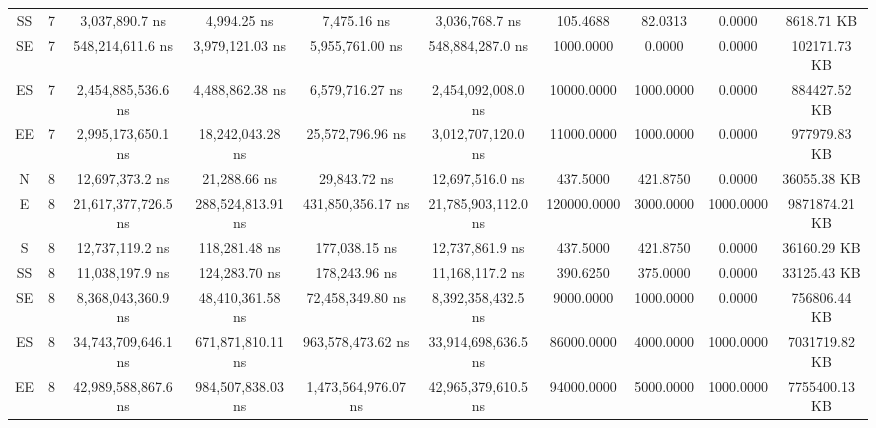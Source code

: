 \begin{sidewaystable}
\begin{tabular}{|c|c|c|c|c|c|c|c|c|c|}
        SS      &   7       &   3,037,890.7 ns        &   4,994.25 ns       &   7,475.16 ns           &   3,036,768.7 ns        &   105.4688    &   82.0313     &   0.0000      &   8618.71 KB       \\
        SE      &   7       &   548,214,611.6 ns      &   3,979,121.03 ns   &   5,955,761.00 ns       &   548,884,287.0 ns      &   1000.0000   &   0.0000      &   0.0000      &   102171.73 KB     \\
        ES      &   7       &   2,454,885,536.6 ns    &   4,488,862.38 ns   &   6,579,716.27 ns       &   2,454,092,008.0 ns    &   10000.0000  &   1000.0000   &   0.0000      &   884427.52 KB     \\
        EE      &   7       &   2,995,173,650.1 ns    &   18,242,043.28 ns  &   25,572,796.96 ns      &   3,012,707,120.0 ns    &   11000.0000  &   1000.0000   &   0.0000      &   977979.83 KB     \\
        N       &   8       &   12,697,373.2 ns       &   21,288.66 ns      &   29,843.72 ns          &   12,697,516.0 ns       &   437.5000    &   421.8750    &   0.0000      &   36055.38 KB      \\
        E       &   8       &   21,617,377,726.5 ns   &   288,524,813.91 ns &   431,850,356.17 ns     &   21,785,903,112.0 ns   &   120000.0000 &   3000.0000   &   1000.0000   &   9871874.21 KB    \\
        S       &   8       &   12,737,119.2 ns       &   118,281.48 ns     &   177,038.15 ns         &   12,737,861.9 ns       &   437.5000    &   421.8750    &   0.0000      &   36160.29 KB      \\
        SS      &   8       &   11,038,197.9 ns       &   124,283.70 ns     &   178,243.96 ns         &   11,168,117.2 ns       &   390.6250    &   375.0000    &   0.0000      &   33125.43 KB      \\
        SE      &   8       &   8,368,043,360.9 ns    &   48,410,361.58 ns  &   72,458,349.80 ns      &   8,392,358,432.5 ns    &   9000.0000   &   1000.0000   &   0.0000      &   756806.44 KB     \\
        ES      &   8       &   34,743,709,646.1 ns   &   671,871,810.11 ns &   963,578,473.62 ns     &   33,914,698,636.5 ns   &   86000.0000  &   4000.0000   &   1000.0000   &   7031719.82 KB    \\
        EE      &   8       &   42,989,588,867.6 ns   &   984,507,838.03 ns &   1,473,564,976.07 ns   &   42,965,379,610.5 ns   &   94000.0000  &   5000.0000   &   1000.0000   &   7755400.13 KB    \\

\end{tabular}
\end{sidewaystable}
